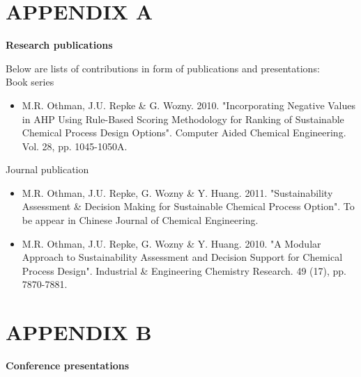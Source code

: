 \chapter*{\textbf{APPENDIX A}} \label{APPENDIX A}

\begin{center}
	\textbf{Research publications}\\
	\vspace{0.5cm}
\end{center}

\noindent
Below are lists of contributions in form of publications and presentations: \\

\noindent
Book series
\begin{itemize}
	\item M.R. Othman, J.U. Repke \& G. Wozny. 2010. "Incorporating Negative Values in AHP Using Rule-Based Scoring Methodology for Ranking of Sustainable Chemical Process Design Options". Computer Aided Chemical Engineering. Vol. 28, pp. 1045-1050A.
\end{itemize}

\noindent
Journal publication
\begin{itemize}
	\item M.R. Othman, J.U. Repke, G. Wozny \& Y. Huang. 2011. "Sustainability Assessment \& Decision Making for Sustainable Chemical Process Option". To be appear in Chinese Journal of Chemical Engineering.
	\item M.R. Othman, J.U. Repke, G. Wozny \& Y. Huang. 2010. "A Modular Approach to Sustainability Assessment and Decision Support for Chemical Process Design".  Industrial \& Engineering Chemistry Research. 49 (17), pp. 7870-7881.
\end{itemize}


\chapter*{\textbf{APPENDIX B}} \label{APPENDIX B}

\begin{center}
	\textbf{Conference presentations}\\
	\vspace{0.5cm}
\end{center}

